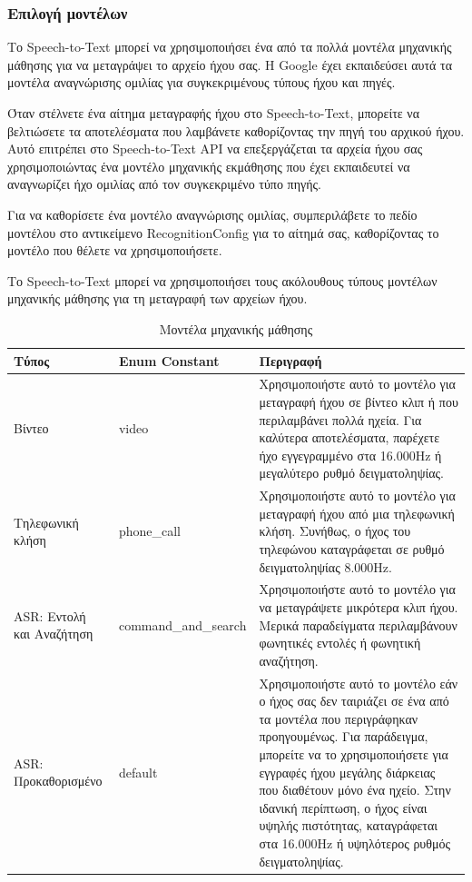 \documentclass[oneside, 12pt]{book}
\begin{document}
\subsubsection{Επιλογή μοντέλων}
Το Speech-to-Text μπορεί να χρησιμοποιήσει ένα από τα πολλά μοντέλα μηχανικής μάθησης για να μεταγράψει το αρχείο ήχου σας. Η Google έχει εκπαιδεύσει αυτά τα μοντέλα αναγνώρισης ομιλίας για συγκεκριμένους τύπους ήχου και πηγές.

Όταν στέλνετε ένα αίτημα μεταγραφής ήχου στο Speech-to-Text, μπορείτε να βελτιώσετε τα αποτελέσματα που λαμβάνετε καθορίζοντας την πηγή του αρχικού ήχου. Αυτό επιτρέπει στο Speech-to-Text API να επεξεργάζεται τα αρχεία ήχου σας χρησιμοποιώντας ένα μοντέλο μηχανικής εκμάθησης που έχει εκπαιδευτεί να αναγνωρίζει ήχο ομιλίας από τον συγκεκριμένο τύπο πηγής.

Για να καθορίσετε ένα μοντέλο αναγνώρισης ομιλίας, συμπεριλάβετε το πεδίο μοντέλου στο αντικείμενο RecognitionConfig για το αίτημά σας, καθορίζοντας το μοντέλο που θέλετε να χρησιμοποιήσετε.

Το Speech-to-Text μπορεί να χρησιμοποιήσει τους ακόλουθους τύπους μοντέλων μηχανικής μάθησης για τη μεταγραφή των αρχείων ήχου.
\begin{table}[!h]
  \centering
  \caption{Μοντέλα μηχανικής μάθησης}
  \begin{tabularx}{\linewidth}[h]{|p{2cm}|p{4cm}|X|}
    \hline
    Τύπος & Enum Constant & Περιγραφή \\
    \hline
    \hline
    Βίντεο & video & Χρησιμοποιήστε αυτό το μοντέλο για μεταγραφή ήχου σε βίντεο κλιπ ή που περιλαμβάνει πολλά ηχεία. Για καλύτερα αποτελέσματα, παρέχετε ήχο εγγεγραμμένο στα 16.000Hz ή μεγαλύτερο ρυθμό δειγματοληψίας. \\
    \hline
    Τηλεφωνική κλήση & phone\_call & Χρησιμοποιήστε αυτό το μοντέλο για μεταγραφή ήχου από μια τηλεφωνική κλήση. Συνήθως, ο ήχος του τηλεφώνου καταγράφεται σε ρυθμό δειγματοληψίας 8.000Hz. \\
    \hline
    ASR: Εντολή και Αναζήτηση & command\_and\_search & Χρησιμοποιήστε αυτό το μοντέλο για να μεταγράψετε μικρότερα κλιπ ήχου. Μερικά παραδείγματα περιλαμβάνουν φωνητικές εντολές ή φωνητική αναζήτηση. \\
    \hline
    ASR: Προκαθορισμένο & default & Χρησιμοποιήστε αυτό το μοντέλο εάν ο ήχος σας δεν ταιριάζει σε ένα από τα μοντέλα που περιγράφηκαν προηγουμένως. Για παράδειγμα, μπορείτε να το χρησιμοποιήσετε για εγγραφές ήχου μεγάλης διάρκειας που διαθέτουν μόνο ένα ηχείο. Στην ιδανική περίπτωση, ο ήχος είναι υψηλής πιστότητας, καταγράφεται στα 16.000Hz ή υψηλότερος ρυθμός δειγματοληψίας. \\
    \hline
  \end{tabularx}
\end{table}
\newpage
\end{document}
